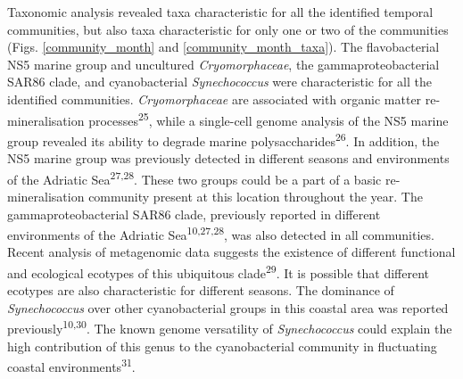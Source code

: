 \documentclass[
  12pt,
]{article}
\begin{document}
Taxonomic analysis revealed taxa characteristic for all the identified
temporal communities, but also taxa characteristic for only one or two
of the communities (Figs. \ref{community_month} and
\ref{community_month_taxa}). The flavobacterial NS5 marine group and
uncultured \emph{Cryomorphaceae}, the gammaproteobacterial SAR86 clade,
and cyanobacterial \emph{Synechococcus} were characteristic for all the
identified communities. \emph{Cryomorphaceae} are associated with
organic matter re-mineralisation processes\textsuperscript{25}, while a
single-cell genome analysis of the NS5 marine group revealed its ability
to degrade marine polysaccharides\textsuperscript{26}. In addition, the
NS5 marine group was previously detected in different seasons and
environments of the Adriatic Sea\textsuperscript{27,28}. These two
groups could be a part of a basic re-mineralisation community present at
this location throughout the year. The gammaproteobacterial SAR86 clade,
previously reported in different environments of the Adriatic
Sea\textsuperscript{10,27,28}, was also detected in all communities.
Recent analysis of metagenomic data suggests the existence of different
functional and ecological ecotypes of this ubiquitous
clade\textsuperscript{29}. It is possible that different ecotypes are
also characteristic for different seasons. The dominance of
\emph{Synechococcus} over other cyanobacterial groups in this coastal
area was reported previously\textsuperscript{10,30}. The known genome
versatility of \emph{Synechococcus} could explain the high contribution
of this genus to the cyanobacterial community in fluctuating coastal
environments\textsuperscript{31}.
\end{document}

